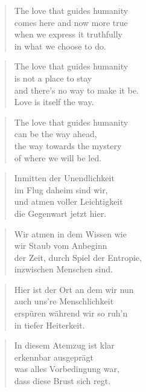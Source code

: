 \documentclass[10pt,a4paper]{article}
\begin{document}
\begin{paracol}{2}
\begin{verse}
The love that guides humanity\\
comes here and now more true\\
when we express it truthfully\\
in what we choose to do.
\end{verse}

\begin{verse}
The love that guides humanity\\
is not a place to stay\\
and there’s no way to make it be.\\
Love is itself the way.
\end{verse}

\begin{verse}
The love that guides humanity\\
can be the way ahead,\\
the way towards the mystery\\
of where we will be led.
\end{verse}

\switchcolumn



\begin{verse}
Inmitten der Unendlichkeit \\
im Flug daheim sind wir, \\
und atmen voller Leichtigkeit \\
die Gegenwart jetzt hier. \\
\end{verse}

\begin{verse}
Wir atmen in dem Wissen wie \\
wir Staub vom Anbeginn \\
der Zeit, durch Spiel der Entropie, \\
inzwischen Menschen sind. \\
\end{verse}

\begin{verse}
Hier ist der Ort an dem wir nun \\
auch uns’re Menschlichkeit \\
erspüren während wir so ruh’n \\
in tiefer Heiterkeit. \\
\end{verse}

\begin{verse}
In diesem Atemzug ist klar \\
erkennbar ausgeprägt \\
was alles Vorbedingung war, \\
dass diese Brust sich regt. \\
\end{verse}


\end{paracol}
\end{document}
